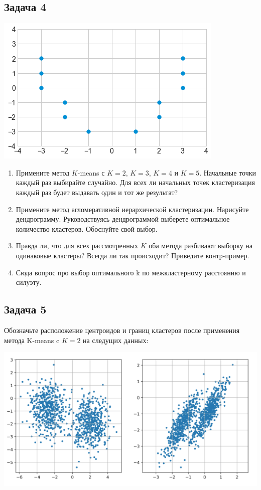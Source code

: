 \documentclass[12pt, a4paper, oneside]{article}
\begin{document}
\subsection*{Задача 4} 

\begin{center}
	\includegraphics[scale=0.7]{knn_3.png}
\end{center}

\begin{enumerate}
	\item Примените метод $K$-means с $K=2$, $K=3$, $K=4$ и $K=5$. Начальные точки каждый раз выбирайте случайно.  Для всех ли начальных точек кластеризация каждый раз будет выдавать один и тот же результат? 
	\item Примените метод агломеративной иерархической кластеризации. Нарисуйте дендрограмму. Руководствуясь дендрограммой выберете оптимальное количество кластеров. Обоснуйте свой выбор.
	\item Правда ли, что для всех рассмотренных $K$ оба метода разбивают выборку на одинаковые кластеры?  Всегда ли так происходит? Приведите контр-пример. 
	
	\item Сюда вопрос про выбор оптимального k по межкластерному расстоянию и силуэту.
	
\end{enumerate}


\subsection*{Задача 5} 

Обозначьте расположение центроидов и границ кластеров после применения метода K-means c $K=2$ на следущих данных: 

\begin{center}
 \includegraphics[scale=0.2]{clouds.png}
\end{center}
\end{document}
